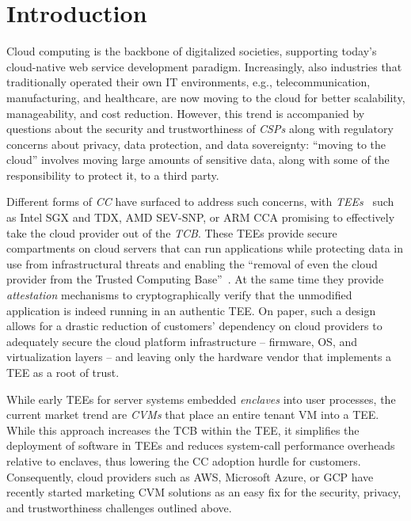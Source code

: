 \section{Introduction}
%
Cloud computing is the backbone of digitalized societies, supporting today's
cloud-native web service development paradigm. Increasingly, also industries
that traditionally operated their own IT environments, e.g., telecommunication,
manufacturing, and healthcare, are now moving to the cloud for better
scalability, manageability, and cost reduction. However, this trend is
accompanied by questions about the security and trustworthiness of
\emph{\acp{CSP}} along with regulatory concerns about privacy, data protection,
and data sovereignty: ``moving to the cloud'' involves moving large amounts of
sensitive data, along with some of the responsibility to protect it, to a third
party.

Different forms of \emph{\ac{CC}} have surfaced to address such concerns,
with \emph{\acp{TEE}}~\cite{schneider2022hardware} such as Intel SGX and
TDX, AMD SEV-SNP, or ARM CCA promising to effectively take the cloud
provider out of the \emph{\ac{TCB}}. These \acp{TEE} provide secure
compartments on cloud servers that can run applications while protecting
data in use from infrastructural threats and enabling the ``removal of even
the cloud provider from the Trusted Computing
Base''~\cite{confcon2022marketing}. At the same time they provide
\emph{attestation} mechanisms to cryptographically verify that the
unmodified application is indeed running in an authentic \ac{TEE}.  On
paper, such a design allows for a drastic reduction of customers'
dependency on cloud providers to adequately secure the cloud platform
infrastructure -- firmware, OS, and virtualization layers -- and leaving
only the hardware vendor that implements a \ac{TEE} as a root of trust.

While early \acp{TEE} for server systems embedded \emph{enclaves} into user
processes, the current market trend are \emph{\acp{CVM}} that place an entire
tenant VM into a \ac{TEE}.  While this approach increases the \ac{TCB} within
the \ac{TEE}, it simplifies the deployment of software in \acp{TEE} and reduces
system-call performance overheads~\cite{akram2020performance} relative to
enclaves, thus lowering the \ac{CC} adoption hurdle for customers. Consequently,
cloud providers such as \ac{AWS}, Microsoft Azure, or \ac{GCP} have recently
started marketing \ac{CVM} solutions as an easy fix for the security, privacy,
and trustworthiness challenges outlined above.

